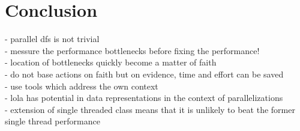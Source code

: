 \chapter{Conclusion}
- parallel dfs is not trivial\\
- messure the performance bottlenecks before fixing the performance!\\
- location of bottlenecks quickly become a matter of faith \\
- do not base actions on faith but on evidence, time and effort can be saved\\
- use tools which address the own context\\
- lola has potential in data representations in the context of parallelizations\\

- extension of single threaded class means that it is unlikely to beat the former single thread performance\\